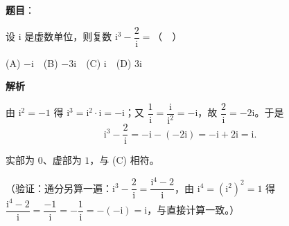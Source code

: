 \begin{answer}

\textbf{题目}：

设 \(\mathrm{i}\) 是虚数单位，则复数 \(\mathrm{i}^3-\dfrac{2}{\mathrm{i}}=\)（　）

(A) \(-\mathrm{i}\)　(B) \(-3\mathrm{i}\)　(C) \(\mathrm{i}\)　(D) \(3\mathrm{i}\)

\textbf{解析}

由 \(\mathrm{i}^2=-1\) 得 \(\mathrm{i}^3=\mathrm{i}^2\cdot\mathrm{i}=-\mathrm{i}\)；又 \(\dfrac{1}{\mathrm{i}}=\dfrac{\mathrm{i}}{\mathrm{i}^2}=-\mathrm{i}\)，故 \(\dfrac{2}{\mathrm{i}}=-2\mathrm{i}\)。于是
\nopagebreak[4]
\[
\mathrm{i}^3-\dfrac{2}{\mathrm{i}}=-\mathrm{i}-(-2\mathrm{i})=-\mathrm{i}+2\mathrm{i}=\mathrm{i}.
\]

实部为 \(0\)、虚部为 \(1\)，与 (C) 相符。

（验证：通分另算一遍：\(\mathrm{i}^3-\dfrac{2}{\mathrm{i}}=\dfrac{\mathrm{i}^4-2}{\mathrm{i}}\)，由 \(\mathrm{i}^4=\left(\mathrm{i}^2\right)^2=1\) 得 \(\dfrac{\mathrm{i}^4-2}{\mathrm{i}}=\dfrac{-1}{\mathrm{i}}=-\dfrac{1}{\mathrm{i}}=-(-\mathrm{i})=\mathrm{i}\)，与直接计算一致。）


\end{answer}
